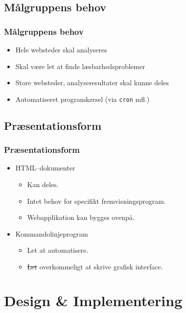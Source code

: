 \documentclass{beamer}
\begin{document}
\subsection{Målgruppens behov}
\begin{frame}
  \frametitle{Målgruppens behov}
  \begin{itemize}
  \item<1-> Hele websteder skal analyseres
  \item<2-> Skal være let at finde læsbarhedsproblemer
  \item<3-> Store websteder, analyseresultater skal kunne deles
  \item<4-> Automatiseret programkørsel (via \texttt{cron} mfl.)
  \end{itemize}
\end{frame}

\subsection{Præsentationsform}
\begin{frame}
  \frametitle{Præsentationsform}
  \begin{itemize}
    \item<1->HTML--dokumenter
      \begin{itemize}
      \item<1-> Kan deles.
      \item<2-> Intet behov for specifikt fremvisningsprogram.
      \item<3-> Webapplikation kan bygges ovenpå.
      \end{itemize}  

    \item<4->Kommandolinjeprogram
      \begin{itemize}
      \item<4-> Let at automatisere.
      \item<5-> \st{Let} overkommeligt at skrive grafisk interface.
      \end{itemize}  
    \end{itemize}
\end{frame}

\section{Design \& Implementering}
\end{document}
